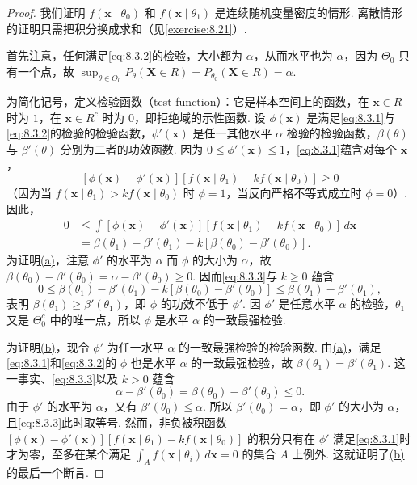 \begin{proof}
我们证明 $f(\boldsymbol x\mid\theta_0)$ 和 $f(\boldsymbol x\mid\theta_1)$ 是连续随机变量密度的情形. 离散情形的证明只需把积分换成求和（见\autoref{exercise:8.21}\mbox{）.}

首先注意，任何满足\eqref{eq:8.3.2}的检验，大小都为 $\alpha$，从而水平也为 $\alpha$，因为 $\Theta_0$ 只有一个点，故 $\sup_{\theta\in\Theta_0}P_\theta(\boldsymbol X\in R)=P_{\theta_0}(\boldsymbol X\in R)=\alpha$.

为简化记号，定义检验函数（test function）：它是样本空间上的函数，在 $\boldsymbol x\in R$ 时为 $1$，在 $\boldsymbol x\in R^c$ 时为 $0$，即拒绝域的示性函数. 设 $\phi(\boldsymbol x)$ 是满足\eqref{eq:8.3.1}与\eqref{eq:8.3.2}的检验的检验函数，$\phi'(\boldsymbol x)$ 是任一其他水平 $\alpha$ 检验的检验函数，$\beta(\theta)$ 与 $\beta'(\theta)$ 分别为二者的功效函数. 因为 $0\le\phi'(\boldsymbol x)\le1$，\eqref{eq:8.3.1}蕴含对每个 $\boldsymbol x$，
$$[\phi(\boldsymbol x)-\phi'(\boldsymbol x)][f(\boldsymbol x\mid\theta_1)-kf(\boldsymbol x\mid\theta_0)]\ge0$$
（因为当 $f(\boldsymbol x\mid\theta_1)>kf(\boldsymbol x\mid\theta_0)$ 时 $\phi=1$，当反向严格不等式成立时 $\phi=0$\mbox{）.} 因此，
\begin{equation}\label{eq:8.3.3}
\begin{aligned}
0&\le\int[\phi(\boldsymbol x)-\phi'(\boldsymbol x)][f(\boldsymbol x\mid\theta_1)-kf(\boldsymbol x\mid\theta_0)]\,d\boldsymbol x\\
&=\beta(\theta_1)-\beta'(\theta_1)-k[\beta(\theta_0)-\beta'(\theta_0)].
\end{aligned}
\end{equation}
为证明\hyperref[itm:thm:8.3.12:a]{(a)}，注意 $\phi'$ 的水平为 $\alpha$ 而 $\phi$ 的大小为 $\alpha$，故 $\beta(\theta_0)-\beta'(\theta_0)=\alpha-\beta'(\theta_0)\ge0$. 因而\eqref{eq:8.3.3}与 $k\ge0$ 蕴含
$$0\le\beta(\theta_1)-\beta'(\theta_1)-k[\beta(\theta_0)-\beta'(\theta_0)]\le\beta(\theta_1)-\beta'(\theta_1),$$
表明 $\beta(\theta_1)\ge\beta'(\theta_1)$，即 $\phi$ 的功效不低于 $\phi'$. 因 $\phi'$ 是任意水平 $\alpha$ 的检验，$\theta_1$ 又是 $\Theta_0^c$ 中的唯一点，所以 $\phi$ 是水平 $\alpha$ 的一致最强检验.

为证明\hyperref[itm:thm:8.3.12:b]{(b)}，现令 $\phi'$ 为任一水平 $\alpha$ 的一致最强检验的检验函数. 由\hyperref[itm:thm:8.3.12:a]{(a)}，满足\eqref{eq:8.3.1}和\eqref{eq:8.3.2}的 $\phi$ 也是水平 $\alpha$ 的一致最强检验，故 $\beta(\theta_1)=\beta'(\theta_1)$. 这一事实、\eqref{eq:8.3.3}以及 $k>0$ 蕴含
$$\alpha-\beta'(\theta_0)=\beta(\theta_0)-\beta'(\theta_0)\le0.$$
由于 $\phi'$ 的水平为 $\alpha$，又有 $\beta'(\theta_0)\le\alpha$. 所以 $\beta'(\theta_0)=\alpha$，即 $\phi'$ 的大小为 $\alpha$，且\eqref{eq:8.3.3}此时取等号. 然而，非负被积函数 $[\phi(\boldsymbol x)-\phi'(\boldsymbol x)][f(\boldsymbol x\mid\theta_1)-kf(\boldsymbol x\mid\theta_0)]$ 的积分只有在 $\phi'$ 满足\eqref{eq:8.3.1}时才为零，至多在某个满足 $\int_Af(\boldsymbol x\mid\theta_i)\,d\boldsymbol x=0$ 的集合 $A$ 上例外. 这就证明了\hyperref[itm:thm:8.3.12:b]{(b)}的最后一个断言.
\end{proof}
